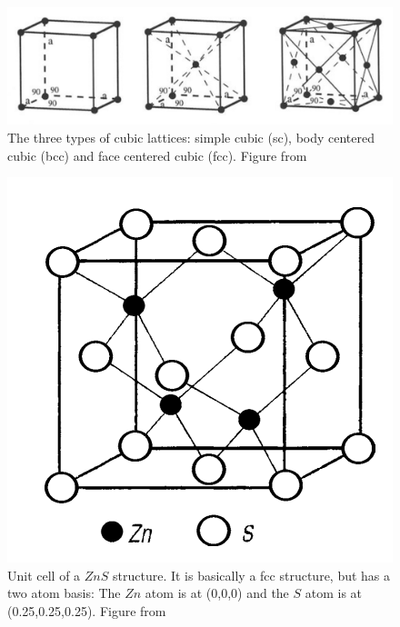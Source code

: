 \begin{figure}[ht]
    \centering
    \includegraphics[width = 0.8\linewidth]{Bilder/Grundlagen/cubic lattices.png}
    \caption{The three types of cubic lattices: simple cubic (sc), body centered cubic (bcc) and face centered cubic (fcc). Figure from~\cite{Schwarzenbach.2001}}
    \label{fig:ScBccFcc}
\end{figure}

\begin{figure}[ht]
    \centering
    \includegraphics[width = 0.45\linewidth]{Bilder/Grundlagen/ZnS.png}
    \caption{Unit cell of a $ZnS$ structure. It is basically a fcc structure, but has a two atom basis: The $Zn$ atom is at (0,0,0) and the $S$ atom is at (0.25,0.25,0.25). Figure from~\cite{Bohm.2021}}
    \label{fig:ZnSStructure}
\end{figure}